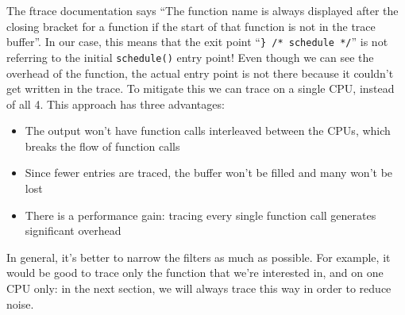 \documentclass[10pt]{book}
\begin{document}
The ftrace documentation says ``The function name is always displayed after the closing bracket for a function if the start of that function is not in the trace buffer''. In our case, this means that the exit point ``\verb|} /* schedule */|'' is not referring to the initial \verb|schedule()| entry point! Even though we can see the overhead of the function, the actual entry point is not there because it couldn't get written in the trace. To mitigate this we can trace on a single CPU, instead of all 4. This approach has three advantages: 
\begin{itemize}
    \item The output won't have function calls interleaved between the CPUs, which breaks the flow of function calls
    \item Since fewer entries are traced, the buffer won't be filled and many won't be lost
    \item There is a performance gain: tracing every single function call generates significant overhead
\end{itemize}
In general, it's better to narrow the filters as much as possible. For example, it would be good to trace only the function that we're interested in, and on one CPU only: in the next section, we will always trace this way in order to reduce noise.
\end{document}
